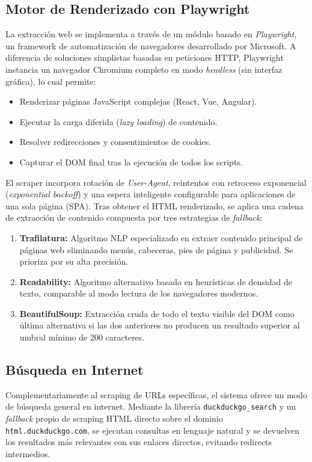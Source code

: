 \subsection{Motor de Renderizado con Playwright}
La extracción web se implementa a través de un módulo basado en \textit{Playwright}, un framework de automatización de navegadores desarrollado por Microsoft. A diferencia de soluciones simplistas basadas en peticiones HTTP, Playwright instancia un navegador Chromium completo en modo \textit{headless} (sin interfaz gráfica), lo cual permite:

\begin{itemize}
    \item Renderizar páginas JavaScript complejas (React, Vue, Angular).
    \item Ejecutar la carga diferida (\textit{lazy loading}) de contenido.
    \item Resolver redirecciones y consentimientos de cookies.
    \item Capturar el DOM final tras la ejecución de todos los scripts.
\end{itemize}

El scraper incorpora rotación de \textit{User-Agent}, reintentos con retroceso exponencial (\textit{exponential backoff}) y una espera inteligente configurable para aplicaciones de una sola página (SPA). Tras obtener el HTML renderizado, se aplica una cadena de extracción de contenido compuesta por tres estrategias de \textit{fallback}:

\begin{enumerate}
    \item \textbf{Trafilatura:} Algoritmo NLP especializado en extraer contenido principal de páginas web eliminando menús, cabeceras, pies de página y publicidad. Se prioriza por su alta precisión.
    \item \textbf{Readability:} Algoritmo alternativo basado en heurísticas de densidad de texto, comparable al modo lectura de los navegadores modernos.
    \item \textbf{BeautifulSoup:} Extracción cruda de todo el texto visible del DOM como última alternativa si las dos anteriores no producen un resultado superior al umbral mínimo de 200 caracteres.
\end{enumerate}

\subsection{Búsqueda en Internet}
Complementariamente al scraping de URLs específicas, el sistema ofrece un modo de búsqueda general en internet. Mediante la librería \texttt{duckduckgo\_search} y un \textit{fallback} propio de scraping HTML directo sobre el dominio \texttt{html.duckduckgo.com}, se ejecutan consultas en lenguaje natural y se devuelven los resultados más relevantes con sus enlaces directos, evitando redirects intermedios.

